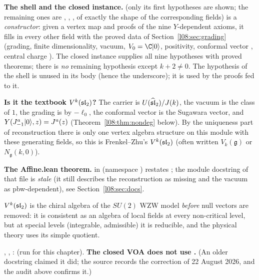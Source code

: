 \begin{dictionary}
\textbf{The shell and the closed instance.}  (only its first hypotheses are shown;
the remaining ones are , , , of exactly the shape of
the corresponding  fields) is a \emph{constructor}: given a vertex map and
proofs of the nine $Y$-dependent axioms, it fills in every other field with the proved data of
Section~\ref{l08:sec:grading} (grading, finite dimensionality, vacuum, $V_0=\C\leightvac$, positivity,
conformal vector , central charge ). The closed instance
\allowbreak{} supplies all nine hypotheses with proved theorems; there is \emph{no}
remaining hypothesis except $k+2\ne0$. The hypothesis  of the shell is unused in its body
(hence the underscore); it is used by the proofs fed to it.

\textbf{Is it the textbook $V^k(\mathfrak{sl}_2)$?} The carrier is $U(\widehat{\mathfrak{sl}}_2)/J(k)$, the vacuum is the
class of $1$, the grading is by $-\ell_0$, the conformal vector is the Sugawara vector, and
$Y(J^a_{-1}|0\rangle,z) = J^a(z)$ (Theorem~\ref{l08:thm:nondeg} below). By the uniqueness part of
reconstruction there is only one vertex algebra structure on this module with these generating
fields, so this is Frenkel--Zhu's $V^k(\mathfrak{sl}_2)$ (often written $V_k(\mathfrak g)$ or $N_{\mathfrak g}(k,0)$).

\textbf{The Affine.lean theorem.} \allowbreak{} in
 (namespace ) restates ; the module docstring of that file is \emph{stale} (it still describes the
reconstruction as missing and the vacuum as pbw-dependent), see Section~\ref{l08:sec:docs}.
\end{dictionary}

\begin{physics}
$V^k(\mathfrak{sl}_2)$ is the chiral algebra of the $SU(2)$ WZW model \emph{before} null vectors are removed:
it is consistent as an algebra of local fields at every non-critical level, but at special levels
(integrable, admissible) it is reducible, and the physical theory uses its simple quotient.
\end{physics}

\begin{status}
\allowbreak{}\allowbreak{}\allowbreak{}, \allowbreak{}\allowbreak{}\allowbreak{}\allowbreak{}\allowbreak{},
\allowbreak{}\allowbreak{}: \lean{[propext, Classical.}\allowbreak{}\allowbreak\lean{sound]} (run for this
chapter). \textbf{The closed VOA does not use .} (An older docstring claimed it did; the
source records the correction of 22 August 2026, and the audit above confirms it.)
\end{status}

